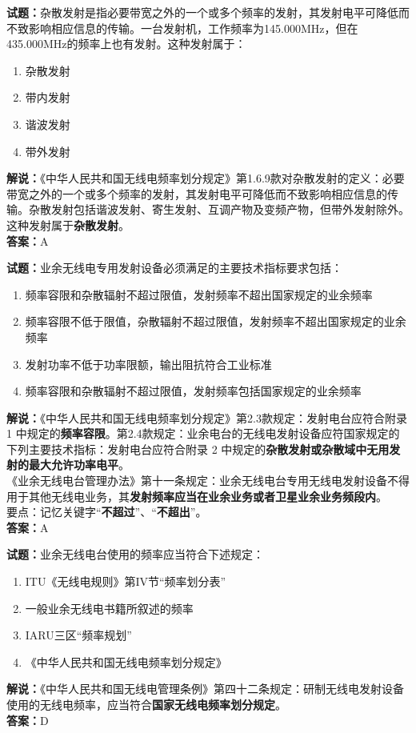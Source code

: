 \documentclass{ctexbook}
\begin{document}
\vspace{1em}

\textbf{试题：}杂散发射是指必要带宽之外的一个或多个频率的发射，其发射电平可降低而不致影响相应信息的传输。一台发射机，工作频率为145.000\unit{\MHz}，但在435.000\unit{\MHz}的频率上也有发射。这种发射属于：
\begin{enumerate}[leftmargin=3em]
  \item 杂散发射
  \item 带内发射
  \item 谐波发射
  \item 带外发射
\end{enumerate}
\noindent\textbf{解说：}《中华人民共和国无线电频率划分规定》第1.6.9款对杂散发射的定义：必要带宽之外的一个或多个频率的发射，其发射电平可降低而不致影响相应信息的传
输。杂散发射包括谐波发射、寄生发射、互调产物及变频产物，但带外发射除外。\\这种发射属于\textbf{杂散发射}。\\\noindent\textbf{答案：}A

\vspace{1em}

\textbf{试题：}业余无线电专用发射设备必须满足的主要技术指标要求包括：
\begin{enumerate}[leftmargin=3em]
  \item 频率容限和杂散辐射不超过限值，发射频率不超出国家规定的业余频率
  \item 频率容限不低于限值，杂散辐射不超过限值，发射频率不超出国家规定的业余频率
  \item 发射功率不低于功率限额，输出阻抗符合工业标准
  \item 频率容限和杂散辐射不超过限值，发射频率包括国家规定的业余频率
\end{enumerate}
\noindent\textbf{解说：}《中华人民共和国无线电频率划分规定》第2.3款规定：发射电台应符合附录 1 中规定的\textbf{频率容限}。第2.4款规定：业余电台的无线电发射设备应符国家规定的下列主要技术指标：发射电台应符合附录 2 中规定的\textbf{杂散发射或杂散域中无用发射的最大允许功率电平}。\\《业余无线电台管理办法》第十一条规定：业余无线电台专用无线电发射设备不得用于其他无线电业务，其\textbf{发射频率应当在业余业务或者卫星业余业务频段内}。\\要点：记忆关键字“\textbf{不超过}”、“\textbf{不超出}”。\\\noindent\textbf{答案：}A

\vspace{1em}

\textbf{试题：}业余无线电台使用的频率应当符合下述规定：
\begin{enumerate}[leftmargin=3em]
  \item ITU《无线电规则》第IV节“频率划分表”
  \item 一般业余无线电书籍所叙述的频率
  \item IARU三区“频率规划”
  \item 《中华人民共和国无线电频率划分规定》
\end{enumerate}
\noindent\textbf{解说：}《中华人民共和国无线电管理条例》第四十二条规定：研制无线电发射设备使用的无线电频率，应当符合\textbf{国家无线电频率划分规定}。\\\noindent\textbf{答案：}D
\end{document}
